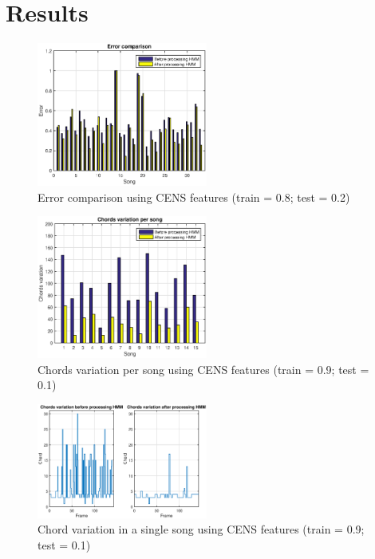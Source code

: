 \section{Results}
\label{sec:results}


\begin{figure} [h!]
	\includegraphics[width=0.5\textwidth]{img/Result_HMM/CENS/plot03071}
	\caption{Error comparison using CENS features (train = 0.8; test = 0.2)}
\end{figure}


\begin{figure} [h!]
	\includegraphics[width=0.5\textwidth]{img/Result_HMM/SMOOTHING/smoothingPerSong0109}
	\caption{Chords variation per song using CENS features (train = 0.9; test = 0.1)}
\end{figure}

\begin{figure} [h!]
	\includegraphics[width=0.5\textwidth]{img/Result_HMM/SMOOTHING/smoothingSingleSong0109}
	\caption{Chord variation in a single song using CENS features (train = 0.9; test = 0.1)}
\end{figure}
